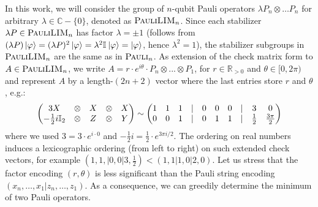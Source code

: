 In this work, we will consider the group of $n$-qubit Pauli operators $\lambda P_n \otimes \dots P_n$ for arbitrary $\lambda \in \mathbb{C}-\{0\}$, denoted as $\paulilim_n$.
Since each stabilizer $\lambda P \in \paulilim_n$ has factor $\lambda =\pm 1$ (follows from
$ (\lambda P)\ket{\phi} = (\lambda P)^2 \ket{\phi} =  \lambda^2 \id \ket{\phi}  =\ket{\phi}$, hence $\lambda^2 = 1$), the stabilizer subgroups in $\paulilim_n$ are the same as in $\pauli_n$.
As extension of the check matrix form to $A \in \paulilim_n$, we write $A = r \cdot e^{i\theta} \cdot P_n \otimes ...\otimes P_1$, for $r \in \mathbb{R}_{> 0}$ and $\theta\in [0, 2\pi)$ and represent $A$ by a length-$(2n+2)$ vector where the last entries store $r$ and $\theta$, e.g.:
\[
    \begin{pmatrix}
        3X &\otimes& X &\otimes& X\\
        -\frac{1}{2} i\id[2] &\otimes& Z &\otimes& Y
    \end{pmatrix}
    \sim
    \begin{pmatrix}
        1& 1& 1& |& 0& 0& 0& |&3 & 0\\
        0& 0& 1& |& 0& 1& 1& |&\frac{1}{2} & \frac{3\pi}{2}
    \end{pmatrix}
\]
where we used $3 = 3\cdot e^{i\cdot 0}$ and $-\frac{1}{2}i = \frac{1}{2} \cdot e^{3\pi i/2}$.
The ordering on real numbers induces a lexicographic ordering (from left to right) on such extended check vectors, for example $(1, 1, | 0, 0 | 3, \frac{1}{2} ) < (1, 1 | 1, 0 | 2, 0)$.
Let us stress that the factor encoding $(r, \theta)$ is less significant than the Pauli string encoding $(x_n, \dots, x_1 | z_n, \dots, z_1)$.
As a consequence, we can greedily determine the minimum of two Pauli operators.


